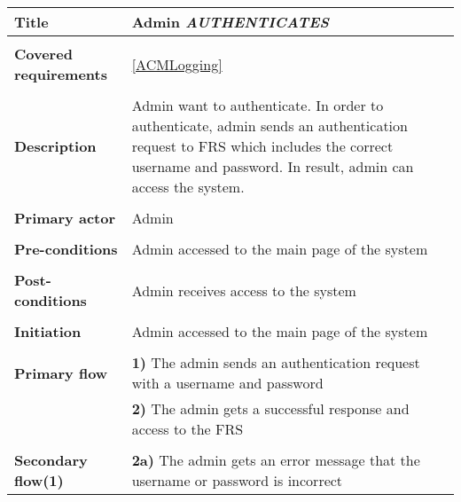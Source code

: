 \documentclass[a4paper,11pt]{article}
\begin{document}
\begin{tabular}{|p{3.5cm}|p{11.5cm}|} \hline 
    \textbf{Title} &   Admin \emph{AUTHENTICATES}  
   
    \\ \hline \rowcolor{Gray} & \\ \hline 
  
    \textbf{Covered requirements} &  \ref{ACMLogging}
  
    \\ \hline \rowcolor{Gray} & \\ \hline 
  
    \textbf{Description} &  Admin want to authenticate. In order to authenticate, admin sends an authentication request to FRS which includes the correct username and password. In result, admin can access the system. 
   
    \\ \hline \rowcolor{Gray} & \\ \hline 
   
    \textbf{Primary actor} & Admin   
   
    \\ \hline \rowcolor{Gray} & \\ \hline  
   
    \textbf{Pre-conditions} &   Admin accessed to the main page of the system 
   
    \\ \hline \rowcolor{Gray} & \\ \hline 
   
    \textbf{Post-conditions} &   Admin receives access to the system 
   
    \\ \hline \rowcolor{Gray} & \\ \hline  
   
    \textbf{Initiation} & Admin accessed to the main page of the system 
   
    \\ \hline \rowcolor{Gray} & \\ \hline  
   
    \textbf{Primary flow} &  
    \textbf{1)} The admin sends an authentication request with a username and password  \\& 
    \textbf{2)} The admin gets a successful response and access to the FRS
   
    \\ \hline \rowcolor{Gray} & \\ \hline  
   
    \textbf{Secondary flow(1)} &  
    \textbf{2a)} The admin gets an error message that the username or password is incorrect 
    
    \\ \hline   
\end{tabular}
\end{document}
